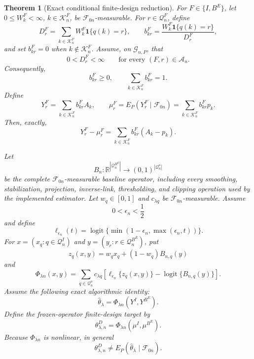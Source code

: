 \documentclass[11pt]{article}
\newtheorem{theorem}{Theorem}[section]
\theoremstyle{definition}
\newcommand{\1}{\mathbf 1}\newcommand{\op}{\operatorname}
\begin{document}
\begin{theorem}[Exact conditional finite-design reduction]
For $F\in\{I,B^E\}$, let
$0\le W_k^F<\infty$, $k\in\mathcal K_n^F$, be
$\mathcal F_{0n}$-measurable. For
$r\in\mathcal Q_n^F$, define
\begin{equation}
D_r^F
=
\sum_{k\in\mathcal K_n^F}
W_k^F\mathbf 1\{q(k)=r\},
\qquad
b_{kr}^F
=
\frac{
W_k^F\mathbf 1\{q(k)=r\}
}{D_r^F},
\label{eq:normalized-cell-weights-final}
\end{equation}
and set $b_{kr}^F=0$ when $k\notin\mathcal K_n^F$.
Assume, on $\mathcal G_{n,P}$, that
\[
0<D_r^F<\infty
\qquad
\text{for every }(F,r)\in\mathcal A_n.
\]
Consequently,
\[
b_{kr}^F\ge0,
\qquad
\sum_{k\in\mathcal K_n^F}b_{kr}^F=1.
\]
Define
\begin{equation}
Y_r^F
=
\sum_{k\in\mathcal K_n^F}b_{kr}^FA_k,
\qquad
\mu_r^F
=
E_P(Y_r^F\mid\mathcal F_{0n})
=
\sum_{k\in\mathcal K_n^F}b_{kr}^Fp_k.
\label{eq:cell-means-final}
\end{equation}
Then, exactly,
\begin{equation}
Y_r^F-\mu_r^F
=
\sum_{k\in\mathcal K_n^F}
b_{kr}^F(A_k-p_k).
\label{eq:centered-cell-means-final}
\end{equation}

Let
\[
B_n:
\mathbb R^{|\mathcal Q_n^{B^E}|}
\longrightarrow
(0,1)^{|\mathcal Q_n^o|}
\]
be the complete $\mathcal F_{0n}$-measurable baseline operator,
including every smoothing, stabilization, projection, inverse-link,
thresholding, and clipping operation used by the implemented
estimator. Let $w_q\in[0,1]$ and $c_{\lambda q}$ be
$\mathcal F_{0n}$-measurable. Assume
\[
0<\epsilon_n<\frac12
\]
and define
\[
\ell_{\epsilon_n}(t)
=
\operatorname{logit}
\{\min(1-\epsilon_n,\max(\epsilon_n,t))\}.
\]
For $x=(x_q:q\in\mathcal Q_n^I)$ and
$y=(y_r:r\in\mathcal Q_n^{B^E})$, put
\begin{equation}
z_q(x,y)
=
w_qx_q+(1-w_q)B_{n,q}(y)
\label{eq:stabilized-map-final}
\end{equation}
and
\begin{equation}
\Phi_{\lambda n}(x,y)
=
\sum_{q\in\mathcal Q_n^o}
c_{\lambda q}
\left[
\ell_{\epsilon_n}\{z_q(x,y)\}
-
\operatorname{logit}\{B_{n,q}(y)\}
\right].
\label{eq:frozen-functional-final}
\end{equation}
Assume the following exact algorithmic identity:
\begin{equation}
\widehat\theta_\lambda
=
\Phi_{\lambda n}(Y^I,Y^{B^E}).
\label{eq:exact-estimator-representation-final}
\end{equation}
Define the frozen-operator finite-design target by
\begin{equation}
\theta_{\lambda,n}^D
=
\Phi_{\lambda n}(\mu^I,\mu^{B^E}).
\label{eq:finite-design-target-final}
\end{equation}
Because $\Phi_{\lambda n}$ is nonlinear, in general
\[
\theta_{\lambda,n}^D
\ne
E_P(\widehat\theta_\lambda\mid\mathcal F_{0n}).
\]


\end{theorem}
\end{document}
